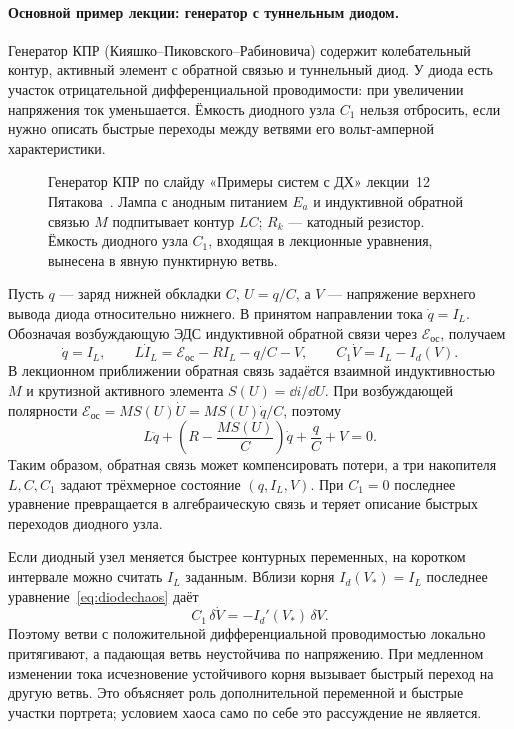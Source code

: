 \paragraph{Основной пример лекции: генератор с туннельным диодом.}
Генератор КПР (Кияшко--Пиковского--Рабиновича) содержит колебательный контур, активный элемент с обратной связью и туннельный диод. У диода есть участок отрицательной дифференциальной проводимости: при увеличении напряжения ток уменьшается. Ёмкость диодного узла $C_1$ нельзя отбросить, если нужно описать быстрые переходы между ветвями его вольт-амперной характеристики.

\begin{figure}[H]\centering

\caption{Генератор КПР по слайду «Примеры систем с ДХ» лекции~12 Пятакова~\cite{pyatakov12}. Лампа с анодным питанием $E_a$ и индуктивной обратной связью $M$ подпитывает контур $LC$; $R_k$ --- катодный резистор. Ёмкость диодного узла $C_1$, входящая в лекционные уравнения, вынесена в явную пунктирную ветвь.}
\label{fig:diode-generator}
\end{figure}

Пусть $q$ --- заряд нижней обкладки $C$, $U=q/C$, а $V$ --- напряжение верхнего вывода диода относительно нижнего. В принятом направлении тока $\dot q=I_L$. Обозначая возбуждающую ЭДС индуктивной обратной связи через $\mathcal E_{\mathrm{ос}}$, получаем
\begin{equation}\label{eq:diodechaos}
 \dot q=I_L,\qquad
 L\dot I_L=\mathcal E_{\mathrm{ос}}-RI_L-q/C-V,\qquad
 C_1\dot V=I_L-I_d(V).
\end{equation}
В лекционном приближении обратная связь задаётся взаимной индуктивностью $M$ и крутизной активного элемента $S(U)=\dd i/\dd U$. При возбуждающей полярности $\mathcal E_{\mathrm{ос}}=MS(U)\dot U=MS(U)\dot q/C$, поэтому
\begin{equation}
 L\ddot q+\left(R-\frac{MS(U)}C\right)\dot q+\frac qC+V=0.
\end{equation}
Таким образом, обратная связь может компенсировать потери, а три накопителя $L,C,C_1$ задают трёхмерное состояние $(q,I_L,V)$. При $C_1=0$ последнее уравнение превращается в алгебраическую связь и теряет описание быстрых переходов диодного узла.

Если диодный узел меняется быстрее контурных переменных, на коротком интервале можно считать $I_L$ заданным. Вблизи корня $I_d(V_*)=I_L$ последнее уравнение~\eqref{eq:diodechaos} даёт
\[
 C_1\,\delta\dot V=-I_d'(V_*)\,\delta V.
\]
Поэтому ветви с положительной дифференциальной проводимостью локально притягивают, а падающая ветвь неустойчива по напряжению. При медленном изменении тока исчезновение устойчивого корня вызывает быстрый переход на другую ветвь. Это объясняет роль дополнительной переменной и быстрые участки портрета; условием хаоса само по себе это рассуждение не является.

